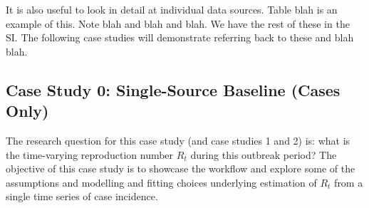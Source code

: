 \documentclass{article}
\begin{document}
It is also useful to look in detail at individual data sources. Table blah is an example of this. Note blah and blah and blah.
We have the rest of these in the SI. 
The following case studies will demonstrate referring back to these and blah blah.



\subsection{Case Study 0: Single-Source Baseline (Cases Only)}


The research question for this case study (and case studies 1 and 2) is: what is the time-varying reproduction number $R_t$ during this outbreak period?
The objective of this case study is to showcase the workflow and explore some of the assumptions and modelling and fitting choices underlying estimation of $R_t$ from a single time series of case incidence.
\end{document}
